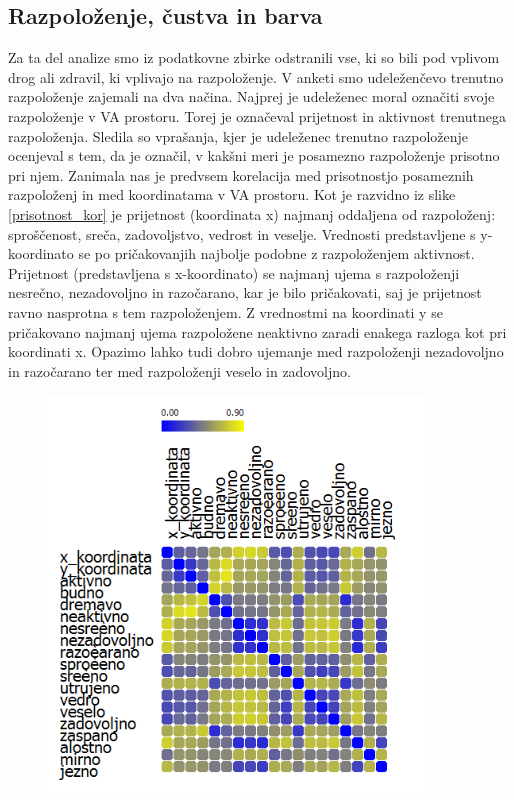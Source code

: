 \documentclass[a4paper, 12pt]{book}
\begin{document}
{\subsection{Razpoloženje, čustva in barva}
\label{razcusbar}

Za ta del analize smo iz podatkovne zbirke odstranili vse, ki so bili pod vplivom drog ali zdravil, ki vplivajo na razpoloženje. V anketi smo udeleženčevo trenutno razpoloženje zajemali na dva načina. Najprej je udeleženec moral označiti svoje razpoloženje v VA prostoru. Torej je označeval prijetnost in aktivnost trenutnega razpoloženja. Sledila so vprašanja, kjer je udeleženec trenutno razpoloženje ocenjeval s tem, da je označil, v kakšni meri je posamezno razpoloženje prisotno pri njem. Zanimala nas je predvsem korelacija med prisotnostjo posameznih razpoloženj in med koordinatama v VA prostoru. Kot je razvidno iz slike \ref{prisotnost_kor} je prijetnost (koordinata x) najmanj oddaljena od razpoloženj: sproščenost, sreča, zadovoljstvo, vedrost in veselje. Vrednosti predstavljene s y-koordinato se po pričakovanjih najbolje podobne z razpoloženjem aktivnost. Prijetnost (predstavljena s x-koordinato) se najmanj ujema s razpoloženji nesrečno, nezadovoljno in razočarano, kar je bilo pričakovati, saj je prijetnost ravno nasprotna s tem razpoloženjem. Z vrednostmi na koordinati y se pričakovano najmanj ujema razpoložene neaktivno zaradi enakega razloga kot pri koordinati x. Opazimo lahko tudi dobro ujemanje med razpoloženji nezadovoljno in razočarano ter med razpoloženji veselo in zadovoljno. 

\begin{figure}[hbt]
\centering
\includegraphics[width=10cm]{images/korelacija.png}


\end{figure}}
\end{document}
